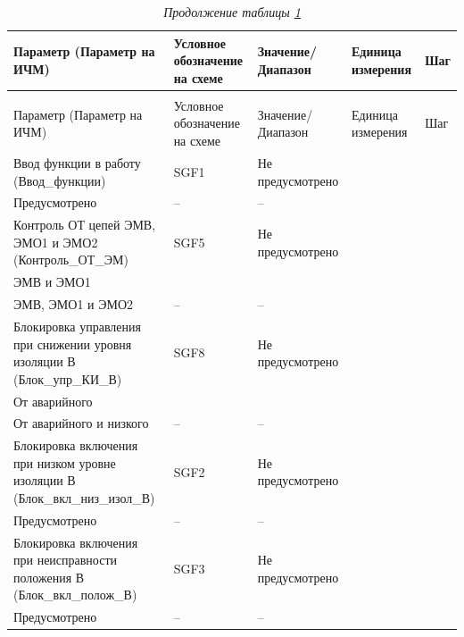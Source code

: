 \footnotesize
\begin{longtable}{|>{\centering\arraybackslash}m{5.3cm}|>{\centering\arraybackslash}m{3.3cm}|>{\centering\arraybackslash}m{4.2cm}|>{\centering\arraybackslash}m{1.8cm}|>{\centering\arraybackslash}m{1cm}|}
\caption{Параметры для настройки КСВ\hfill\vspace{-0.5\baselineskip}}\label{ksv:tbl1}\\ 
\hline
\rowcolor{gray!20}
Параметр (Параметр на ИЧМ) & Условное обозначение на схеме & Значение/ Диапазон & Единица измерения & Шаг \\ 
\hline
\endfirsthead
\caption*{\hspace{3pt}\emph{Продолжение таблицы \ref{ksv:tbl1}\hfill\vspace{-0.5\baselineskip}}} \\ %
\hline
\rowcolor{gray!20}
Параметр (Параметр на ИЧМ) & Условное обозначение на схеме & Значение/ Диапазон & Единица измерения & Шаг \\ 
\endhead
\endfoot
\endlastfoot
\centering Ввод функции в работу (Ввод\_функции)  & \centering SGF1 & \centering Не предусмотрено \\ Предусмотрено & \centering -- & \centering \arraybackslash -- \\
\hline
\centering Контроль ОТ цепей ЭМВ, ЭМО1 и ЭМО2 (Контроль\_ОТ\_ЭМ)  & \centering SGF5 & \centering Не предусмотрено \\ ЭМВ и ЭМО1 \\ ЭМВ, ЭМО1 и ЭМО2 & \centering -- & \centering \arraybackslash -- \\
\hline
\centering Блокировка управления при снижении уровня изоляции В (Блок\_упр\_КИ\_В)  & \centering SGF8 & \centering Не предусмотрено \\ От аварийного \\ От аварийного и низкого & \centering -- & \centering \arraybackslash -- \\
\hline
\centering Блокировка включения при низком уровне изоляции В (Блок\_вкл\_низ\_изол\_В)  & \centering SGF2 & \centering Не предусмотрено \\ Предусмотрено & \centering -- & \centering \arraybackslash -- \\
\hline
\centering Блокировка включения при неисправности положения В (Блок\_вкл\_полож\_В)  & \centering SGF3 & \centering Не предусмотрено \\ Предусмотрено & \centering -- & \centering \arraybackslash -- \\

\end{longtable}
